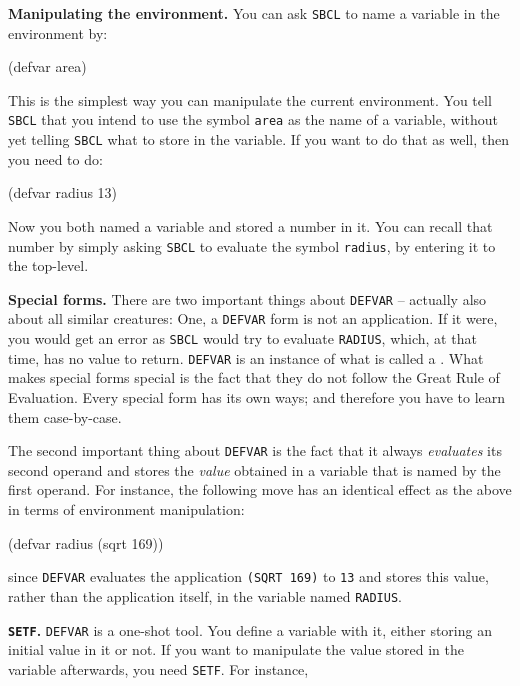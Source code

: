 \documentclass[a4paper,11pt]{article}
\begin{document}
\begin{uenum}
\item {\bf Manipulating the environment.} You can ask \Verb+SBCL+ to name a variable in the environment by:  

\begin{lispcode}
(defvar area)
\end{lispcode}

This is the simplest way you can manipulate the current environment. You tell \Verb+SBCL+ that you intend to use the symbol \Verb+area+ as the name of a variable, without yet telling \Verb+SBCL+ what to store in the variable.  If you want to do that as well, then you need to do:

\begin{lispcode}
(defvar radius 13)
\end{lispcode}

Now you both named a variable and stored a number in it. You can recall that number by simply asking \Verb+SBCL+ to evaluate the symbol \Verb+radius+, by entering it to the top-level.

\item {\bf Special forms.}
There are two important things about \Verb+DEFVAR+ -- actually also about all similar creatures: One, a \Verb+DEFVAR+ form is not an application. If it were, you would get an error as \Verb+SBCL+ would try to evaluate \Verb+RADIUS+, which, at that time, has no value to return. \Verb+DEFVAR+ is an instance of what is called a . What makes special forms special is the fact that they do not follow the Great Rule of Evaluation. Every special form has its own ways; and therefore you have to learn them case-by-case. 

The second important thing about \Verb+DEFVAR+ is the fact that it always \emph{evaluates} its second operand and stores the \emph{value} obtained in a variable that is named by the first operand. For instance, the following move has an identical effect as the above in terms of environment manipulation:

\begin{lispcode}
(defvar radius (sqrt 169))
\end{lispcode}

since \Verb+DEFVAR+ evaluates the application \Verb+(SQRT 169)+ to \Verb+13+ and stores this value, rather than the application itself, in the variable named \Verb+RADIUS+. 

\item {\bf \Verb+SETF+.} \Verb+DEFVAR+ is a one-shot tool. You define a variable with it, either storing an initial value in it or not. If you want to manipulate the value stored in the variable afterwards, you need \Verb+SETF+. For instance,


\end{uenum}
\end{document}
